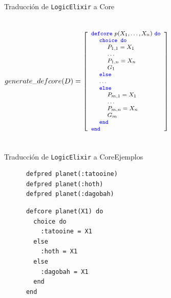 \documentclass[14pt,aspectratio=169]{beamer}
\begin{document}
\begin{frame}{Traducción de \texttt{LogicElixir} a Core}
  \begin{columns}
    \begin{align*}
      \footnotesize generate\_defcore(D) = \left[
        \begin{array}{lcr}
          \textcolor{blue}{\texttt{defcore}\ } p(X_1, \ldots, X_n) \textcolor{blue}{\ \texttt{do}} \\
          \ \ \ \ \textcolor{blue}{\texttt{choice do}} \\
          \ \ \ \ \ \ \ \ P_{1,1} = X_1 \\
          \ \ \ \ \ \ \ \ \ldots \\
          \ \ \ \ \ \ \ \ P_{1,n} = X_n \\
          \ \ \ \ \ \ \ \ G_1\\
          \ \ \ \ \textcolor{blue}{\texttt{else}} \\
          \ \ \ \ \ldots \\
          \ \ \ \ \textcolor{blue}{\texttt{else}} \\
          \ \ \ \ \ \ \ \ P_{m,1} = X_1 \\
          \ \ \ \ \ \ \ \ \ldots \\
          \ \ \ \ \ \ \ \ P_{m,n} = X_n \\
          \ \ \ \ \ \ \ \ G_m\\
          \ \ \ \ \textcolor{blue}{\texttt{end}} \\
          \textcolor{blue}{\texttt{end}}
        \end{array}
      \right]
    \end{align*}
  \end{columns}
\end{frame}

\begin{frame}[fragile]{Traducción de \texttt{LogicElixir} a Core}{Ejemplos}
  \begin{multicols}{2}
    \footnotesize \begin{verbatim}
      defpred planet(:tatooine)
      defpred planet(:hoth)
      defpred planet(:dagobah)
    \end{verbatim}
    \columnbreak
    \footnotesize \begin{verbatim}
      defcore planet(X1) do
        choice do
          :tatooine = X1
        else
          :hoth = X1
        else
          :dagobah = X1
        end
      end
    \end{verbatim}
  \end{multicols}
\end{frame}
\end{document}
